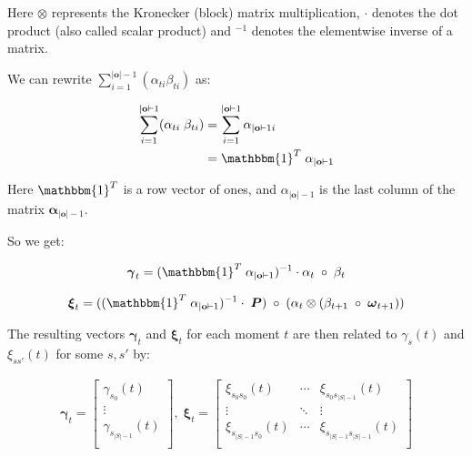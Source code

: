 Here $\otimes$ represents the Kronecker (block) matrix multiplication, $\cdot$ denotes the dot product (also called scalar product) and $^{-1}$ denotes the elementwise inverse of a matrix.

We can rewrite $\sum_{i=1}^{|\mathbf{o}|-1} (\alpha_{t i} \beta_{t i})$ as:

\begin{align}
    \sum_{i=1}^{|\mathbf{o}|-1} (\alpha_{t i} \; \beta_{t i}) &= \sum_{i=1}^{|\mathbf{o}|-1} \alpha_{|\mathbf{o}|-1 i} \\
    &= \mathbbm{1}^T \; \alpha_{|\mathbf{o}|-1}
\end{align}

Here $\mathbbm{1}^T$ is a row vector of ones, and $\alpha_{|\mathbf{o}|-1}$ is the last column of the matrix $\boldsymbol{\alpha}_{|\mathbf{o}|-1}$.

So we get:

\begin{equation}
    \boldsymbol{\gamma}_t = (\mathbbm{1}^T \; \alpha_{|\mathbf{o}|-1})^{-1} \cdot \alpha_t \; \circ \; \beta_t
    \label{eq:gamma-matrix-ones}
\end{equation}

\begin{equation}
    \boldsymbol{\xi}_t = ((\mathbbm{1}^T \; \alpha_{|\mathbf{o}|-1})^{-1} \cdot \; \boldsymbol{P}) \; \circ \;(\alpha_t \otimes (\beta_{t+1} \; \circ \; \boldsymbol{\omega}_{t+1}))
    \label{eq:xi-matrix-ones}
\end{equation}

The resulting vectors $\boldsymbol{\gamma}_t$ and $\boldsymbol{\xi}_t$ for each moment $t$ are then related to $\gamma_s(t)$ and $\xi_{ss'}(t)$ for some $s, s'$ by:

\begin{align}
    \boldsymbol{\gamma}_t = \begin{bmatrix}
                                \gamma_{s_0}(t)       \\
                                \vdots                \\
                                \gamma_{s_{|S|-1}}(t) \\
    \end{bmatrix}, \;
    \boldsymbol{\xi}_t = \begin{bmatrix}
                             \xi_{s_0 s_0}(t)      & \cdots & \xi_{s_0 s_{|S|-1}}(t)      \\
                             \vdots                & \ddots & \vdots                      \\
                             \xi_{s_{|S|-1}s_0}(t) & \cdots & \xi_{s_{|S|-1}s_{|S|-1}}(t) \\
    \end{bmatrix}
\end{align}

